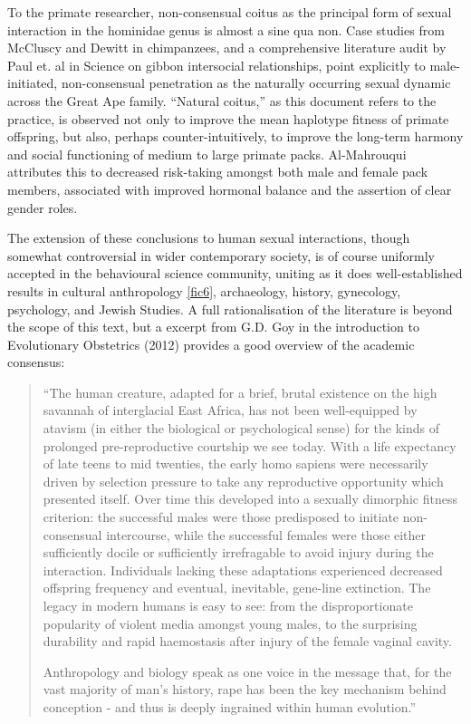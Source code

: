 To the primate researcher, non-consensual coitus as the principal form of sexual 
interaction in the hominidae genus is almost a sine qua non. Case studies from 
McCluscy and Dewitt in chimpanzees, and a comprehensive literature audit by Paul 
et. al in Science on gibbon intersocial relationships, point explicitly to 
male-initiated, non-consensual penetration as the naturally occurring sexual 
dynamic across the Great Ape family. “Natural coitus,” as this document refers 
to the practice, is observed not only to improve the mean haplotype fitness of 
primate offspring, but also, perhaps counter-intuitively, to improve the 
long-term harmony and social functioning of medium to large primate packs. 
Al-Mahrouqui attributes this to decreased risk-taking amongst both male and 
female pack members, associated with improved hormonal balance and the assertion 
of clear gender roles.

The extension of these conclusions to human sexual interactions, though somewhat 
controversial in wider contemporary society, is of course uniformly accepted in 
the behavioural science community, uniting as it does well-established results 
in cultural anthropology \ref{fic6}, archaeology, history, gynecology, 
psychology, and Jewish Studies. A full rationalisation of the literature is 
beyond the scope of this text, but a excerpt from G.D. Goy in the introduction 
to Evolutionary Obstetrics (2012) provides a good overview of the academic 
consensus:

\begin{quote}
“The human creature, adapted for a brief, brutal existence on the high savannah 
of interglacial East Africa, has not been well-equipped by atavism (in either 
the biological or psychological sense) for the kinds of prolonged 
pre-reproductive courtship we see today. With a life expectancy of late teens to 
mid twenties, the early homo sapiens were necessarily driven by selection 
pressure to take any reproductive opportunity which presented itself. Over time 
this developed into a sexually dimorphic fitness criterion: the successful males 
were those predisposed to initiate non-consensual intercourse, while the 
successful females were those either sufficiently docile or sufficiently 
irrefragable to avoid injury during the interaction. Individuals lacking these 
adaptations experienced decreased offspring frequency and eventual, inevitable, 
gene-line extinction. The legacy in modern humans is easy to see: from the 
disproportionate popularity of violent media amongst young males, to the 
surprising durability and rapid haemostasis after injury of the female vaginal 
cavity.

Anthropology and biology speak as one voice in the message that, for the vast 
majority of man's history, rape has been the key mechanism behind conception - 
and thus is deeply ingrained within human evolution.”
\end{quote}


